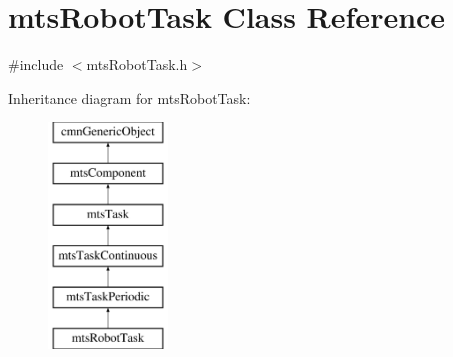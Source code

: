 \hypertarget{classmts_robot_task}{}\section{mts\+Robot\+Task Class Reference}
\label{classmts_robot_task}


{\ttfamily \#include $<$mts\+Robot\+Task.\+h$>$}

Inheritance diagram for mts\+Robot\+Task\+:\begin{figure}[H]
\begin{center}
\leavevmode
\includegraphics[height=6.000000cm]{dd/dd1/classmts_robot_task}
\end{center}
\end{figure}
